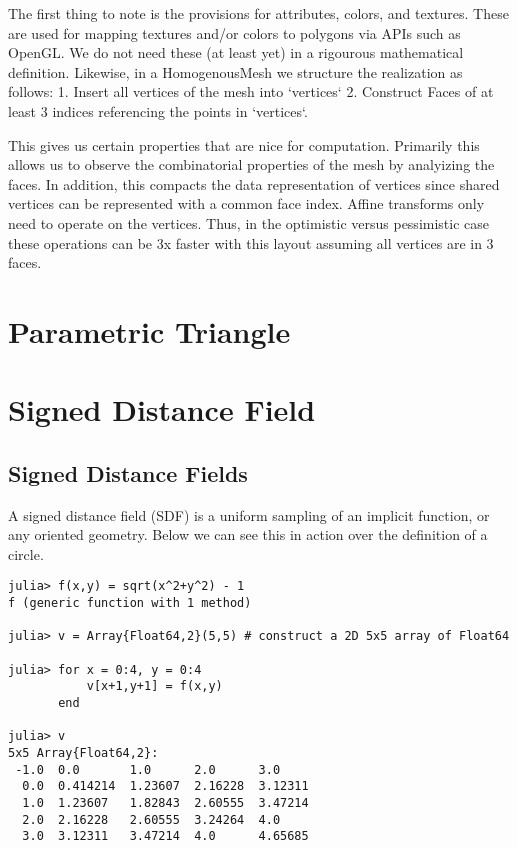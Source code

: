 The first thing to note is the provisions for attributes, colors, and textures.
These are used for mapping textures and/or colors to polygons via APIs such as
OpenGL. We do not need these (at least yet) in a rigourous mathematical
definition. Likewise, in a HomogenousMesh we structure the realization as
follows: 1. Insert all vertices of the mesh into `vertices` 2. Construct
Faces of at least 3 indices referencing the points in `vertices`.

This gives us certain properties that are nice for computation. Primarily
this allows us to observe the combinatorial properties of the mesh by analyizing
the faces. In addition, this compacts the data representation of vertices
since shared vertices can be represented with a common face index. Affine
transforms only need to operate on the vertices. Thus, in the optimistic versus
pessimistic case these operations can be 3x faster with this layout
assuming all vertices are in 3 faces.



\section{Parametric Triangle}




\section{Signed Distance Field}

\subsection{Signed Distance Fields}


A signed distance field (SDF) is a uniform sampling of an implicit function,
or any oriented geometry. 
Below
we can see this in action over the definition of a circle.

\begin{lstlisting}
julia> f(x,y) = sqrt(x^2+y^2) - 1
f (generic function with 1 method)

julia> v = Array{Float64,2}(5,5) # construct a 2D 5x5 array of Float64

julia> for x = 0:4, y = 0:4
           v[x+1,y+1] = f(x,y)
       end

julia> v
5x5 Array{Float64,2}:
 -1.0  0.0       1.0      2.0      3.0    
  0.0  0.414214  1.23607  2.16228  3.12311
  1.0  1.23607   1.82843  2.60555  3.47214
  2.0  2.16228   2.60555  3.24264  4.0    
  3.0  3.12311   3.47214  4.0      4.65685
\end{lstlisting}

